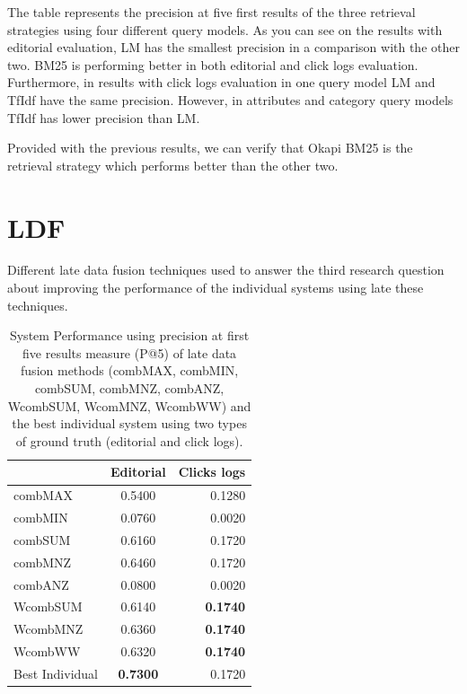 The table represents the precision at five first results of the three retrieval strategies using four different query models. As you can see on the results with editorial evaluation, LM has the smallest precision in a comparison with the other two. BM25 is performing better in both editorial and click logs evaluation. Furthermore, in results with click logs evaluation in one query model LM and TfIdf have the same precision. However, in attributes and category query models TfIdf has lower precision than LM.

Provided with the previous results, we can verify that Okapi BM25 is the retrieval strategy which performs better than the other two.


\section{LDF}

Different late data fusion techniques used to answer the third research question about improving the performance of the individual systems using late these techniques.

\begin{table}[H]
\begin{center}
\footnotesize
\caption{System Performance using precision at first five results measure (P@5) of late data fusion methods (combMAX, combMIN, combSUM, combMNZ, combANZ, WcombSUM, WcomMNZ, WcombWW) and the best individual system using two types of ground truth (editorial and click logs).}
\begin{tabular}{lcr}
\midrule
  & Editorial & Clicks logs\\
 \midrule
	combMAX & 0.5400 & 0.1280\\
	combMIN & 0.0760 & 0.0020 \\
	combSUM & 0.6160 & 0.1720 \\
	combMNZ & 0.6460 & 0.1720 \\
	combANZ & 0.0800 & 0.0020 \\
	WcombSUM & 0.6140 & \textbf{0.1740} \\
	WcombMNZ & 0.6360 & \textbf{0.1740} \\
	WcombWW & 0.6320 & \textbf{0.1740} \\
	Best Individual & \textbf{0.7300} & 0.1720 \\
\bottomrule
\end{tabular}
\end{center}
\end{table}






